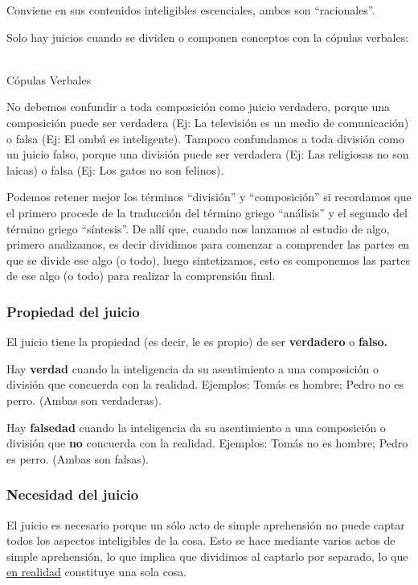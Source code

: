 \documentclass{article}
\newcommand\diagram[2]{\schema{\schemabox{#1}}{\schemabox{#2}}}
\begin{document}
Conviene en sus contenidos inteligibles escenciales, ambos son ``racionales''.

Solo hay juicios cuando se dividen o componen conceptos con la cópulas verbales:
\
\begin{center}
Cópulas Verbales
    \diagram{}{Es \\ No es \\ Esta \\ No esta}
\end{center}

 No debemos confundir a toda composición como juicio verdadero, porque una composición puede ser verdadera (Ej: La televisión es un medio de comunicación) o falsa (Ej: El ombú es inteligente). Tampoco confundamos a toda división como un juicio falso, porque una división puede ser verdadera (Ej: Las religiosas no son laicas) o falsa (Ej: Los gatos no son felinos). \par
    Podemos retener mejor los términos ``división'' y ``composición'' si recordamos que el primero procede de la traducción del término griego ``análisis'' y el segundo del término griego ``síntesis''. De allí que, cuando nos lanzamos al estudio de algo, primero analizamos, es decir dividimos para comenzar a comprender las partes en que se divide ese algo (o todo), luego sintetizamos, esto es componemos las partes de ese algo (o todo) para realizar la comprensión final.


\subsubsection{Propiedad del juicio}
El juicio tiene la propiedad (es decir, le es propio) de ser \textbf{verdadero} o \textbf{falso.} \par
Hay \textbf{verdad} cuando la inteligencia da su asentimiento a una composición o división que concuerda con la realidad. Ejemplos: Tomás es hombre; Pedro no es perro. (Ambas son verdaderas). \par
Hay \textbf{falsedad} cuando la inteligencia da su asentimiento a una composición o división que \textbf{no} concuerda con la realidad. Ejemplos: Tomás no es hombre; Pedro es perro. (Ambas son falsas).
    
\subsubsection{Necesidad del juicio}
El juicio es necesario porque un sólo acto de simple aprehensión no puede captar todos los aspectos inteligibles de la cosa. Esto se hace mediante varios actos de simple aprehensión, lo que implica que dividimos al captarlo por separado, lo que \underline{en realidad} constituye una sola cosa.
\end{document}
